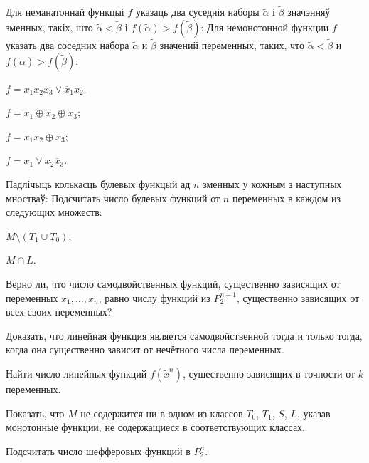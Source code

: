 \documentclass[12pt, a4paper]{article}
\begin{document}
\begin{problemList}
\problemItemWithCommonPart
{Для неманатоннай функцыі $f$ указаць два суседнія наборы $\tilde\alpha$ і $\tilde\beta$ значэнняў зменных,
такіх, што $\tilde\alpha < \tilde\beta$ і $f(\tilde\alpha) > f(\tilde\beta)$:}
{Для немонотонной функции $f$ указать два соседних набора $\tilde\alpha$ и $\tilde\beta$ значений переменных,
таких, что $\tilde\alpha < \tilde\beta$ и $f(\tilde\alpha) > f(\tilde\beta)$:}
{%
\begin{belarusianEnumerateMulticol}
    \item $f=x_1x_2x_3\vee \overline{x}_1x_2$;
    \item $f=x_1\oplus x_2\oplus x_3$;
    \item $f=x_1x_2\oplus x_3$;
    \item $f=x_1\vee x_2\overline{x}_3$.
\end{belarusianEnumerateMulticol}
}

\smallskip

\problemItemWithCommonPart
{Падлічыць колькасць булевых функцый ад $n$ зменных у кожным з наступных мностваў:}
{Подсчитать число булевых функций от $n$ переменных в каждом из следующих множеств:}
{%
\begin{belarusianEnumerateMulticol}
    \item $M\setminus(T_1 \cup T_0)$;
    \item $M \cap L$.
\end{belarusianEnumerateMulticol}
}

\smallskip

{Верно ли, что число самодвойственных функций, существенно зависящих от переменных $x_1, \ldots, x_n$,
равно числу функций из $P_2^{n-1}$, существенно зависящих от всех своих переменных?}

\bigskip

{Доказать, что линейная функция является самодвойственной тогда и только тогда,
когда она существенно зависит от нечётного числа переменных.}

\bigskip

{Найти число линейных функций $f(\tilde x^n)$, существенно зависящих в точности от $k$ переменных.}

\bigskip

{Показать, что $M$ не содержится ни в одном из классов $T_0$, $T_1$, $S$, $L$,
указав монотонные функции, не содержащиеся в соответствующих классах.}

\bigskip

{Подсчитать число шефферовых функций в $P_2^n$.}

\end{problemList}
\end{document}
